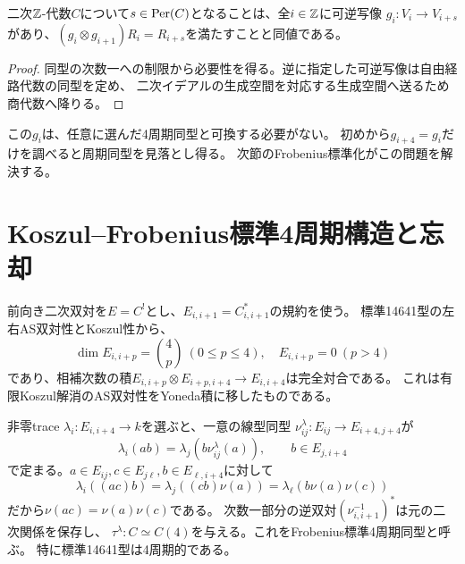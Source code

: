\begin{proposition}\label{prop:period-relations}
二次$\mathbb Z$-代数$C$について$s\in\operatorname{Per}(C)$となることは、全$i\in\mathbb Z$に可逆写像
$g_i:V_i\to V_{i+s}$があり、$(g_i\otimes g_{i+1})R_i=R_{i+s}$を満たすことと同値である。
\end{proposition}
\begin{proof}
同型の次数一への制限から必要性を得る。逆に指定した可逆写像は自由経路代数の同型を定め、
二次イデアルの生成空間を対応する生成空間へ送るため商代数へ降りる。
\end{proof}
\begin{remark}
この$g_i$は、任意に選んだ4周期同型と可換する必要がない。
初めから$g_{i+4}=g_i$だけを調べると周期同型を見落とし得る。
次節のFrobenius標準化がこの問題を解決する。
\end{remark}

\section{Koszul--Frobenius標準4周期構造と忘却}\label{sec:canonical-four}
前向き二次双対を$E=C^!$とし、$E_{i,i+1}=C_{i,i+1}^*$の規約を使う。
標準14641型の左右AS双対性とKoszul性から、
\[
 \dim E_{i,i+p}={4\choose p}\ (0\le p\le4),\quad E_{i,i+p}=0\ (p>4)
\]
であり、相補次数の積$E_{i,i+p}\otimes E_{i+p,i+4}\to E_{i,i+4}$は完全対合である。
これは有限Koszul解消のAS双対性をYoneda積に移したものである\cite{BP,as4period}。

非零trace $\lambda_i:E_{i,i+4}\to k$を選ぶと、一意の線型同型
$\nu^\lambda_{ij}:E_{ij}\to E_{i+4,j+4}$が
\begin{equation}\label{eq:nakayama-pair}
 \lambda_i(ab)=\lambda_j(b\nu^\lambda_{ij}(a)),\qquad b\in E_{j,i+4}
\end{equation}
で定まる。$a\in E_{ij},c\in E_{j\ell},b\in E_{\ell,i+4}$に対して
\[
 \lambda_i((ac)b)=\lambda_j((cb)\nu(a))
 =\lambda_\ell(b\nu(a)\nu(c))
\]
だから$\nu(ac)=\nu(a)\nu(c)$である。
次数一部分の逆双対$(\nu^{-1}_{i,i+1})^*$は元の二次関係を保存し、
$\tau^\lambda:C\simeq C(4)$を与える。これをFrobenius標準4周期同型と呼ぶ。
特に標準14641型は4周期的である。

